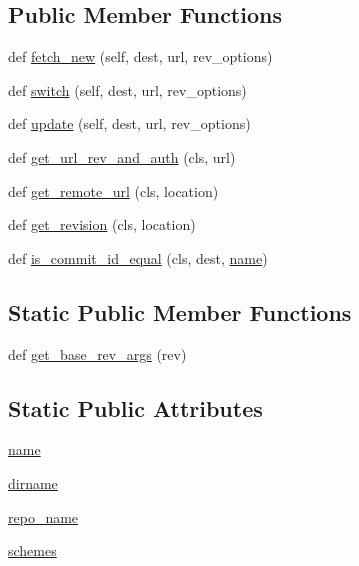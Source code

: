 \subsection*{Public Member Functions}
\begin{DoxyCompactItemize}
\item 
def \hyperlink{classpip_1_1__internal_1_1vcs_1_1bazaar_1_1Bazaar_ada94e9b2c4a6e90c813687f66c2b4746}{fetch\+\_\+new} (self, dest, url, rev\+\_\+options)
\item 
def \hyperlink{classpip_1_1__internal_1_1vcs_1_1bazaar_1_1Bazaar_a4b0582844e574b0f3aa4042e445ec338}{switch} (self, dest, url, rev\+\_\+options)
\item 
def \hyperlink{classpip_1_1__internal_1_1vcs_1_1bazaar_1_1Bazaar_a0ba5a90abd295871d8f9ccd190ac58d6}{update} (self, dest, url, rev\+\_\+options)
\item 
def \hyperlink{classpip_1_1__internal_1_1vcs_1_1bazaar_1_1Bazaar_aae4906e704fdada2b33c19d0804a658f}{get\+\_\+url\+\_\+rev\+\_\+and\+\_\+auth} (cls, url)
\item 
def \hyperlink{classpip_1_1__internal_1_1vcs_1_1bazaar_1_1Bazaar_ac3b0249bbad8adce786c99bf28e817f6}{get\+\_\+remote\+\_\+url} (cls, location)
\item 
def \hyperlink{classpip_1_1__internal_1_1vcs_1_1bazaar_1_1Bazaar_a4b44437ab0ee8f6233737cf313fee76d}{get\+\_\+revision} (cls, location)
\item 
def \hyperlink{classpip_1_1__internal_1_1vcs_1_1bazaar_1_1Bazaar_a9b282e964514cf5ca988b8a891776db9}{is\+\_\+commit\+\_\+id\+\_\+equal} (cls, dest, \hyperlink{classpip_1_1__internal_1_1vcs_1_1bazaar_1_1Bazaar_aec7091fdb24a24c617f25ea489c81669}{name})
\end{DoxyCompactItemize}
\subsection*{Static Public Member Functions}
\begin{DoxyCompactItemize}
\item 
def \hyperlink{classpip_1_1__internal_1_1vcs_1_1bazaar_1_1Bazaar_a827a4cf7d9d2970346ad42348ef70e21}{get\+\_\+base\+\_\+rev\+\_\+args} (rev)
\end{DoxyCompactItemize}
\subsection*{Static Public Attributes}
\begin{DoxyCompactItemize}
\item 
\hyperlink{classpip_1_1__internal_1_1vcs_1_1bazaar_1_1Bazaar_aec7091fdb24a24c617f25ea489c81669}{name}
\item 
\hyperlink{classpip_1_1__internal_1_1vcs_1_1bazaar_1_1Bazaar_a70e0e6ab042305e9e9194b94598853e2}{dirname}
\item 
\hyperlink{classpip_1_1__internal_1_1vcs_1_1bazaar_1_1Bazaar_a76c91f72c718c4484574bce36e826a40}{repo\+\_\+name}
\item 
\hyperlink{classpip_1_1__internal_1_1vcs_1_1bazaar_1_1Bazaar_a67f0f585c0864b3749f8055cc99feecc}{schemes}
\end{DoxyCompactItemize}



